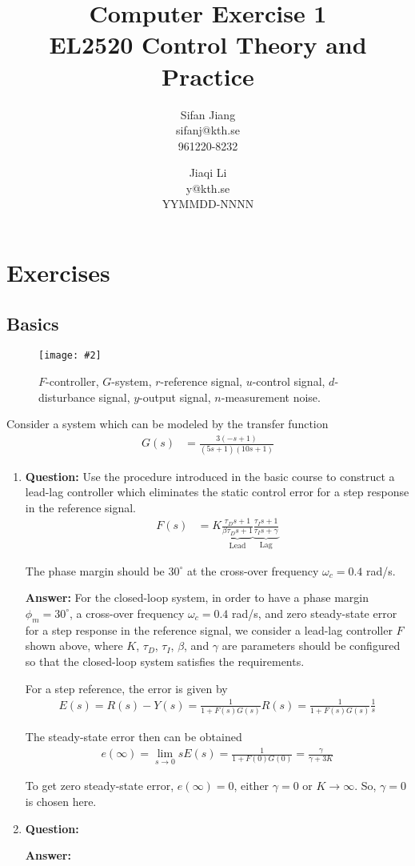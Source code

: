 \documentclass[a4paper,11pt]{article}
\title{
	Computer Exercise 1\\
	EL2520 Control Theory and Practice
}
\author{
	Sifan Jiang\\
	sifanj@kth.se\\
	961220-8232
	\and
	Jiaqi Li\\
	y@kth.se\\
	YYMMDD-NNNN
}
\newcommand{\image}[3]{
	\begin{figure}[!ht]
		\centering
	    \texttt{[image: \#2]}
		\caption{#3}
		\label{fig:#2}
	\end{figure}
}
\begin{document}
\maketitle

\section{Exercises}
\subsection{Basics}
\image{0.75}{system}{$F$-controller, $G$-system, $r$-reference signal, $u$-control signal, $d$-disturbance signal, $y$-output signal, $n$-measurement noise.}
\par Consider a system which can be modeled by the transfer function
\begin{align*}
	G(s) &= \frac{3(-s+1)}{(5s+1)(10s+1)}
\end{align*}
\begin{enumerate}
	\item \textbf{Question:} Use the procedure introduced in the basic course to construct a lead-lag controller which eliminates the static control error for a step response in the reference signal.
	\begin{align*}
		F(s) &= K\underbrace{\frac{\tau_{D}s+1}{\beta\tau_{D}s+1}}_{\mathrm{Lead}}\underbrace{\frac{\tau_{I}s+1}{\tau_{I}s+\gamma}}_{\mathrm{Lag}}
	\end{align*}
	\par The phase margin should be $30^{\circ}$ at the cross-over frequency $\omega_{c}=0.4$ rad/s.
	\par \textbf{Answer:} For the closed-loop system, in order to have a phase margin $\phi_{m}=30^{\circ}$, a cross-over frequency $\omega_{c}=0.4$ rad/s, and zero steady-state error for a step response in the reference signal, we consider a lead-lag controller $F$ shown above, where $K$, $\tau_{D}$, $\tau_{I}$, $\beta$, and $\gamma$ are parameters should be configured so that the closed-loop system satisfies the requirements.
	\par For a step reference, the error is given by
	\begin{align*}
		E(s) = R(s) - Y(s) = \frac{1}{1+F(s)G(s)}R(s) = \frac{1}{1+F(s)G(s)}\frac{1}{s}
	\end{align*}
	\par The steady-state error then can be obtained
	\begin{align*}
		e(\infty) = \lim_{s\rightarrow 0} sE(s) = \frac{1}{1+F(0)G(0)} = \frac{\gamma}{\gamma + 3K}
	\end{align*}
	\par To get zero steady-state error, $e(\infty) = 0$, either $\gamma = 0$ or $K \rightarrow \infty$. So, $\gamma = 0$ is chosen here.
	
	\item \textbf{Question:} 
	\par \textbf{Answer:} 


\end{enumerate}
\end{document}
